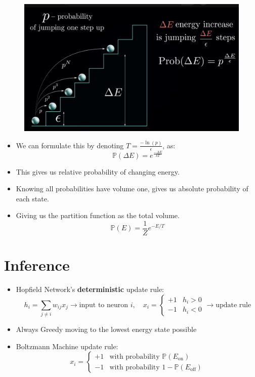 \documentclass{antclass}
\begin{document}
\pagebreak

\begin{figure}[H]
		\centering
	\includegraphics[width=0.8\linewidth]{pics/BM/Ball-Analogy.jpg}
	\label{fig:ball-analogy}
\end{figure}

\pagebreak


\begin{itemize}
	\item We can formulate this by denoting \( T = \frac{-\ln(p)}{\epsilon}\), as:
	\begin{equation}
		\mathbb{P}(\Delta E) = e^{\frac{-\Delta E}{kT}}
	\end{equation}
	\item This gives us relative probability of changing energy.
	\item Knowing all probabilities have volume one, gives us absolute probability of each state.
	\item Giving us the partition function as the total volume.
	\begin{equation}
		\mathbb{P}(E) = \frac{1}{Z} e^{-E/T}
	\end{equation}
	
\end{itemize}


\section{Inference}
\begin{itemize}
	\item Hopfield Network's \textbf{deterministic} update rule:
	\[
	h_i = \sum_{j\neq i} w_{ij}x_j \rightarrow \text{input to neuron }i, \quad x_i = \begin{cases}
		+1 & h_i>0 \\ -1 & h_i <0
	\end{cases} \rightarrow \text{update rule}
	\]
	\item Always Greedy moving to the lowest energy state possible
	\item Boltzmann Machine update rule:
	\[
	 x_i = \begin{cases}
		+1 & \text{with probability }\mathbb{P}( E_{\text{on}}) \\
		-1 & \text{with probability }1-\mathbb{P}(E_{\text{off}})
	\end{cases}
	\]
\end{itemize}
\end{document}
